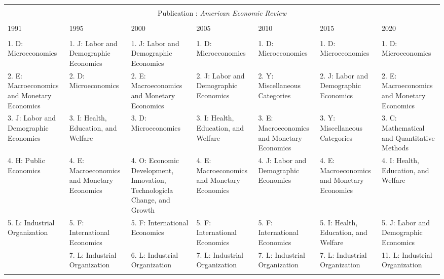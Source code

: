 
\begin{table}[h] \centering 
  \caption{} 
  \label{} 
\begin{tabular}{@{\extracolsep{5pt}} lllllll} 
\\[-1.8ex]\hline 
\hline \\[-1.8ex] \multicolumn{7}{c}{Publication : \textit{American Economic Review}} \\
 \cline{1-7} \\
1991 & 1995 & 2000 & 2005 & 2010 & 2015 & 2020 \\ 
\hline \\[-1.8ex] 
1. D: Microeconomics & 1. J: Labor and Demographic Economics & 1. J: Labor and Demographic Economics & 1. D: Microeconomics & 1. D: Microeconomics & 1. D: Microeconomics & 1. D: Microeconomics \\ 
2. E: Macroeconomics and Monetary Economics & 2. D: Microeconomics & 2. E: Macroeconomics and Monetary Economics & 2. J: Labor and Demographic Economics & 2. Y: Miscellaneous Categories & 2. J: Labor and Demographic Economics & 2. E: Macroeconomics and Monetary Economics \\ 
3. J: Labor and Demographic Economics & 3. I: Health, Education, and Welfare & 3. D: Microeconomics & 3. I: Health, Education, and Welfare & 3. E: Macroeconomics and Monetary Economics & 3. Y: Miscellaneous Categories & 3. C: Mathematical and Quantitative Methods \\ 
4. H: Public Economics & 4. E: Macroeconomics and Monetary Economics & 4. O: Economic Development, Innovation, Technologicla Change, and Growth & 4. E: Macroeconomics and Monetary Economics & 4. J: Labor and Demographic Economics & 4. E: Macroeconomics and Monetary Economics & 4. I: Health, Education, and Welfare \\ 
5. L: Industrial Organization & 5. F: International Economics & 5. F: International Economics & 5. F: International Economics & 5. F: International Economics & 5. I: Health, Education, and Welfare & 5. J: Labor and Demographic Economics \\ 
 & 7. L: Industrial Organization & 6. L: Industrial Organization & 7. L: Industrial Organization & 7. L: Industrial Organization & 7. L: Industrial Organization & 11. L: Industrial Organization \\ 
\hline \\[-1.8ex] 
 

\end{tabular}
\end{table}

